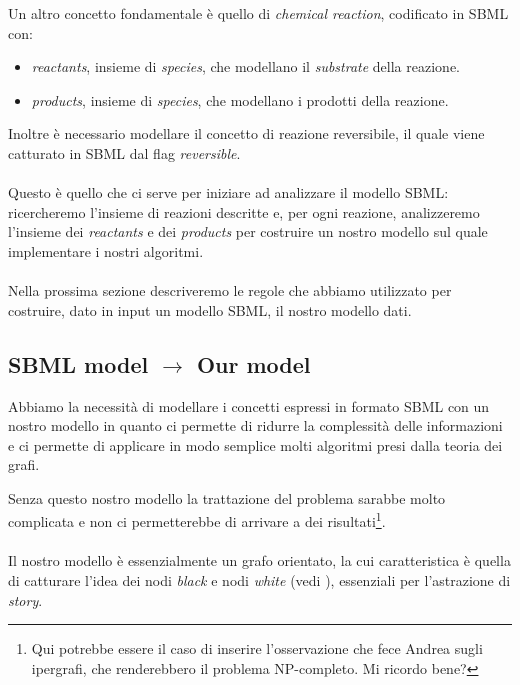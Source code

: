 Un altro concetto fondamentale \`e quello di \emph{chemical reaction},
codificato in SBML con:
\begin{itemize}
\item \emph{reactants}, insieme di \emph{species}, che modellano il
  \emph{substrate} della reazione.
\item \emph{products}, insieme di \emph{species}, che modellano i
  prodotti della reazione.
\end{itemize}
Inoltre \`e necessario modellare il concetto di reazione
reversibile, il quale viene catturato in SBML dal flag
\emph{reversible}.
\\\\
Questo \`e quello che ci serve per iniziare ad analizzare il modello
SBML: ricercheremo l'insieme di reazioni descritte e, per ogni
reazione, analizzeremo l'insieme dei \emph{reactants} e dei
\emph{products} per costruire un nostro modello sul quale implementare
i nostri algoritmi.
\\\\
Nella prossima sezione descriveremo le regole che abbiamo utilizzato
per costruire, dato in input un modello SBML, il nostro modello
dati.

\subsection{SBML model $\rightarrow$ Our model}

Abbiamo la necessit\`a di modellare i concetti espressi in formato
SBML con un nostro modello in quanto ci permette di ridurre la
complessit\`a delle informazioni e ci permette di applicare in modo
semplice molti algoritmi presi dalla teoria dei grafi.

Senza questo nostro modello la trattazione del problema sarabbe molto
complicata e non ci permetterebbe di arrivare a dei
risultati\footnote{Qui potrebbe essere il caso di inserire
  l'osservazione che fece Andrea sugli ipergrafi, che renderebbero il
  problema NP-completo. Mi ricordo bene?}.
\\\\
Il nostro modello \`e essenzialmente un grafo orientato, la cui
caratteristica \`e quella di catturare l'idea dei nodi \emph{black} e
nodi \emph{white} (vedi \cite{tellingStories}), essenziali per
l'astrazione di \emph{story}.

